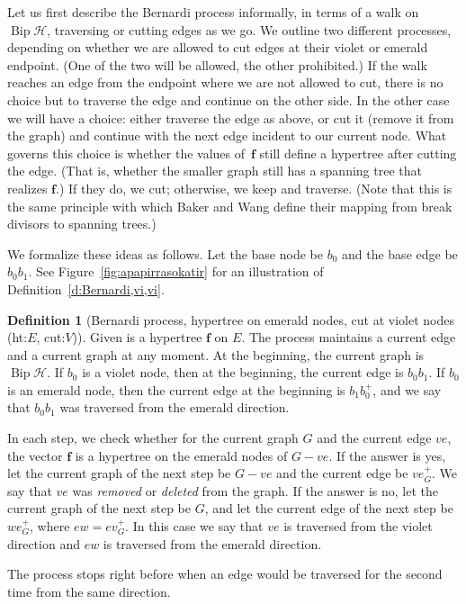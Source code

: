 \documentclass[10pt]{amsart}
\theoremstyle{definition}\newtheorem{defi}[theo]{Definition}
\theoremstyle{remark}\newtheorem{rema}[theo]{Remark}
\newcommand{\HH}{\mathcal H}
\DeclareMathOperator{\bip}{Bip}
\begin{document}
Let us first describe the Bernardi process informally, in terms of a walk on $\bip\HH$, traversing or cutting edges as we go. We outline two different processes, depending on whether we are allowed to cut edges at their violet or emerald endpoint. (One of the two will be allowed, the other prohibited.) If the walk reaches an edge from the endpoint where we are not allowed to cut, there is no choice but to traverse the edge and continue on the other side. In the other case we will have a choice: either traverse the edge as above, or cut it (remove it from the graph) and continue with the next edge incident to our current node. What governs this choice is whether the values of~$\mathbf f$ still define a hypertree after cutting the edge. (That is, whether the smaller graph still has a spanning tree that realizes $\mathbf f$.) If they do, we cut; otherwise, we keep and traverse. (Note that this is the same principle with which Baker and Wang define their mapping from break divisors to spanning trees.)

We formalize these ideas as follows. Let the base node be $b_0$ and the base edge be $b_0b_1$. See Figure~\ref{fig:apapirrasokatir} for an illustration of Definition~\ref{d:Bernardi,vi,vi}.

\begin{defi}[Bernardi process, hypertree on emerald nodes, cut at violet nodes (ht:$E$, cut:$V$)] \label{d:Bernardi,em,vi}
Given is a hypertree $\mathbf f$ on $E$. The process maintains a current edge and a current graph at any moment. At the beginning, the current graph is $\bip \HH$. If $b_0$ is a violet node, then at the beginning, the current edge is $b_0b_1$. If $b_0$ is an emerald node, then the current edge at the beginning is $b_1b_0^+$, and we say that $b_0b_1$ was traversed from the emerald direction.

In each step, we check whether for the current graph $G$ and the current edge $ve$, the vector $\mathbf f$ is a hypertree on the emerald nodes of $G-ve$. If the answer is yes, let the current graph of the next step be $G-ve$ and the current edge be $ve_G^+$. We say that $ve$ was \emph{removed} or \emph{deleted} from the graph. If the answer is no, let the current graph of the next step be $G$, and let the current edge of the next step be $we_G^+$, where $ew = ev_G^+$. In this case we say that $ve$ is traversed from the violet direction and $ew$ is traversed from the emerald direction.

The process stops right before when an edge would be traversed for the second time from the same direction.
\end{defi}
\end{document}
